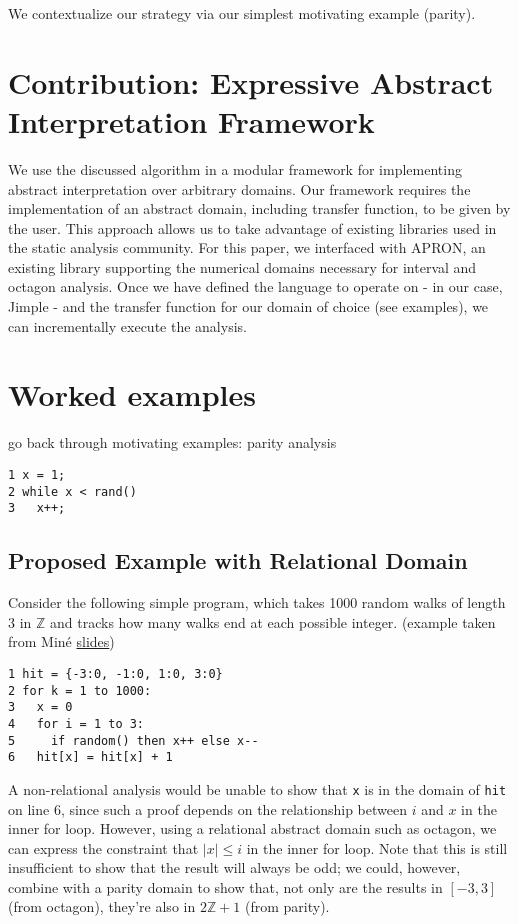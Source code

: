 \documentclass[acmlarge,anonymous]{acmart}\settopmatter{printfolios=true}
\begin{document}
We contextualize our strategy via our simplest motivating example (parity).

\section{Contribution: Expressive Abstract Interpretation Framework}

We use the discussed algorithm in a modular framework for implementing abstract interpretation over arbitrary domains. Our framework requires the implementation of an abstract domain, including transfer function, to be given by the user. This approach allows us to take advantage of existing libraries used in the static analysis community. For this paper, we interfaced with APRON, an existing library supporting the numerical domains necessary for interval and octagon analysis. Once we have defined the language to operate on - in our case, Jimple - and the transfer function for our domain of choice (see examples), we can incrementally execute the analysis.

\section{Worked examples}

go back through motivating examples: parity analysis

\begin{lstlisting}
1 x = 1;
2 while x < rand()
3   x++;
\end{lstlisting}


\subsection{Proposed Example with Relational Domain}

Consider the following simple program, which takes 1000 random walks of length 3 in $\mathbb{Z}$ and tracks how many walks end at each possible integer. (example taken from Min\'e \href{https://pdfs.semanticscholar.org/ccb9/2bfe24199455d7c4a430f756c915cd4e5ae8.pdf}{slides})
\begin{lstlisting}
1 hit = {-3:0, -1:0, 1:0, 3:0}
2 for k = 1 to 1000:
3   x = 0
4   for i = 1 to 3:
5     if random() then x++ else x--
6   hit[x] = hit[x] + 1
\end{lstlisting}

A non-relational analysis would be unable to show that \texttt{x} is in the domain of \texttt{hit} on line 6, since such a proof depends on the relationship between $i$ and $x$ in the inner for loop.  However,  using a relational abstract domain such as octagon, we can express the constraint that $|x|\leq i$ in the inner for loop.  Note that this is still insufficient to show that the result will always be odd; we could, however, combine with a parity domain to show that, not only are the results in $[-3,3]$ (from octagon), they're also in $2\mathbb{Z}+1$ (from parity).
\end{document}
